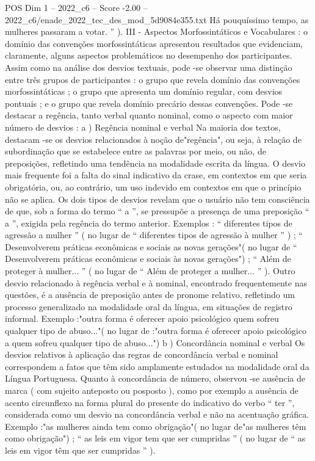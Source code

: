 \begin{textsample}{POS Dim 1 – 2022\_c6 – Score -2.00 – 2022\_c6/enade\_2022\_tec\_des\_mod\_5d9084e355.txt}
Há pouquíssimo tempo, as mulheres passaram a votar. ” ).
III - Aspectos Morfossintáticos e Vocabulares : o domínio das convenções morfossintáticas apresentou resultados que evidenciam, claramente, alguns aspectos problemáticos no desempenho dos participantes.
Assim como na análise dos desvios textuais, pode -se observar uma distinção entre três grupos de participantes : o grupo que revela domínio das convenções morfossintáticas ; o grupo que apresenta um domínio regular, com desvios pontuais ; e o grupo que revela domínio precário dessas convenções.
Pode -se destacar a regência, tanto verbal quanto nominal, como o aspecto com maior número de desvios : a ) Regência nominal e verbal Na maioria dos textos, destacam -se os desvios relacionados à noção de"regência", ou seja, à relação de subordinação que se estabelece entre as palavras por meio, ou não, de preposições, refletindo uma tendência na modalidade escrita da língua.
O desvio mais frequente foi a falta do sinal indicativo da crase, em contextos em que seria obrigatória, ou, ao contrário, um uso indevido em contextos em que o princípio não se aplica.
Os dois tipos de desvios revelam que o usuário não tem consciência de que, sob a forma do termo “ a ”, se pressupõe a presença de uma preposição “ a ”, exigida pela regência do termo anterior.
Exemplos : “ diferentes tipos de agressão a mulher ” ( no lugar de “ diferentes tipos de agressão à mulher ” ) ; “ Desenvolverem práticas econômicas e sociais as novas gerações"( no lugar de “ Desenvolverem práticas econômicas e sociais às novas gerações") ; “ Além de proteger à mulher... ” ( no lugar de “ Além de proteger a mulher... ” ).
Outro desvio relacionado à regência verbal e à nominal, encontrado frequentemente nas questões, é a ausência de preposição antes de pronome relativo, refletindo um processo generalizado na modalidade oral da língua, em situações de registro informal.
Exemplo :"outra forma é oferecer apoio psicológico quem sofreu qualquer tipo de abuso..."( no lugar de :"outra forma é oferecer apoio psicológico a quem sofreu qualquer tipo de abuso...") b ) Concordância nominal e verbal Os desvios relativos à aplicação das regras de concordância verbal e nominal correspondem a fatos que têm sido amplamente estudados na modalidade oral da Língua Portuguesa.
Quanto à concordância de número, observou -se ausência de marca ( com sujeito anteposto ou posposto ), como por exemplo a ausência de acento circunflexo na forma plural do presente do indicativo do verbo “ ter ”, considerada como um desvio na concordância verbal e não na acentuação gráfica.
Exemplo :"as mulheres ainda tem como obrigação"( no lugar de"as mulheres têm como obrigação") ; “ as leis em vigor tem que ser cumpridas ” ( no lugar de “ as leis em vigor têm que ser cumpridas ” ).

\end{textsample}
